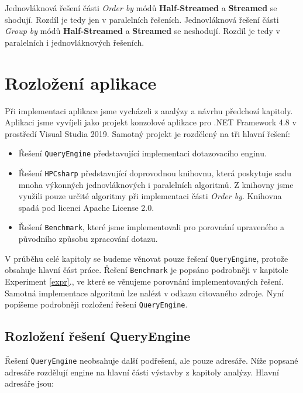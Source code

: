 Jednovláknová řešení části \textit{Order by} módů \textbf{Half-Streamed} a \textbf{Streamed} se shodují.
Rozdíl je tedy jen v paralelních řešeních.
Jednovláknová řešení části \textit{Group by} módů \textbf{Half-Streamed} a \textbf{Streamed} se neshodují.
Rozdíl je tedy v paralelních i jednovláknových řešeních.

\section{Rozložení aplikace} \label{impl.appsolution}

Při implementaci aplikace jsme vycházeli z analýzy a návrhu předchozí kapitoly.
Aplikaci jsme vyvíjeli jako projekt konzolové aplikace pro .NET Framework 4.8 v prostředí Visual Studia 2019.
Samotný projekt je rozdělený na tři hlavní řešení:

\begin{itemize}

\item Řešení \texttt{QueryEngine} představující implementaci dotazovacího enginu.
\item Řešení \texttt{HPCsharp} \citep{hpcsharp} představující doprovodnou knihovnu, která poskytuje sadu mnoha výkonných jednovláknových i paralelních algoritmů.
Z knihovny jsme využili pouze určité algoritmy při implementaci části \textit{Order by}.
Knihovna spadá pod licenci Apache License 2.0.
\item Řešení \texttt{Benchmark}, které jsme implementovali pro porovnání upraveného a původního způsobu zpracování dotazu. 

\end{itemize}

V průběhu celé kapitoly se budeme věnovat pouze řešení \texttt{QueryEngine}, protože obsahuje hlavní část práce.
Řešení \texttt{Benchmark} je popsáno podrobněji v kapitole Experiment \ref{expr}., ve které se věnujeme porovnání implementovaných řešení.
Samotná implementace algoritmů lze nalézt v odkazu citovaného zdroje. 
Nyní popíšeme podrobněji rozložení řešení \texttt{QueryEngine}.

\subsection{Rozložení řešení QueryEngine}

Řešení \texttt{QueryEngine} neobsahuje další podřešení, ale pouze adresáře.
Níže popsané adresáře rozdělují engine na hlavní části výstavby z kapitoly analýzy.
Hlavní adresáře jsou:

